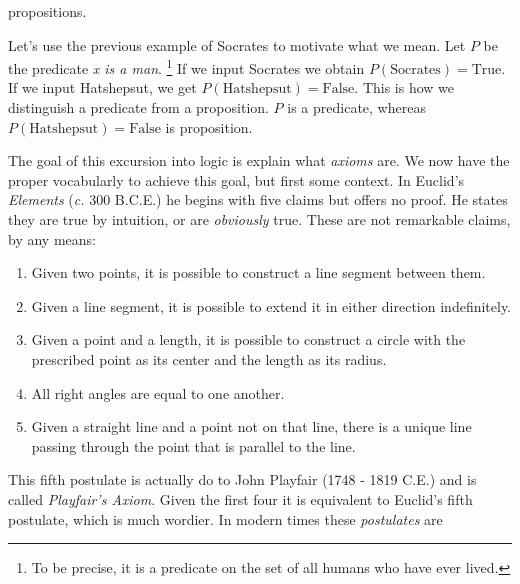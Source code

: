             propositions.
            \begin{example}
                Let's use the previous example of Socrates to motivate what we
                mean. Let $P$ be the predicate \textit{x is a man}.%
                \footnote{%
                    To be precise, it is a predicate on the set of all humans
                    who have ever lived.
                }
                If we input Socrates we obtain $P(\text{Socrates})=\text{True}$.
                If we input Hatshepsut, we get
                $P(\text{Hatshepsut})=\text{False}$. This is how we distinguish
                a predicate from a proposition. $P$ is a predicate, whereas
                $P(\text{Hatshepsut})=\text{False}$ is proposition.
            \end{example}
            The goal of this excursion into logic is explain what
            \textit{axioms} are. We now have the proper vocabularly to achieve
            this goal, but first some context.
            In Euclid's \textit{Elements} (\textit{c.} 300 B.C.E.) he begins
            with five claims but offers no proof. He states they are true by
            intuition, or are \textit{obviously} true. These are not remarkable
            claims, by any means:
            \begin{enumerate}
                \item Given two points, it is possible to construct a line
                    segment between them.
                \item Given a line segment, it is possible to extend it in
                    either direction indefinitely.
                \item Given a point and a length, it is possible to construct a
                    circle with the prescribed point as its center and the
                    length as its radius.
                \item All right angles are equal to one another.
                \item Given a straight line and a point not on that line,
                    there is a unique line passing through the point that is
                    parallel to the line.
            \end{enumerate}
            This fifth postulate is actually do to John Playfair
            (1748 - 1819 C.E.) and is called \textit{Playfair's Axiom}. Given
            the first four it is equivalent to Euclid's fifth postulate, which
            is much wordier. In modern times these \textit{postulates} are
